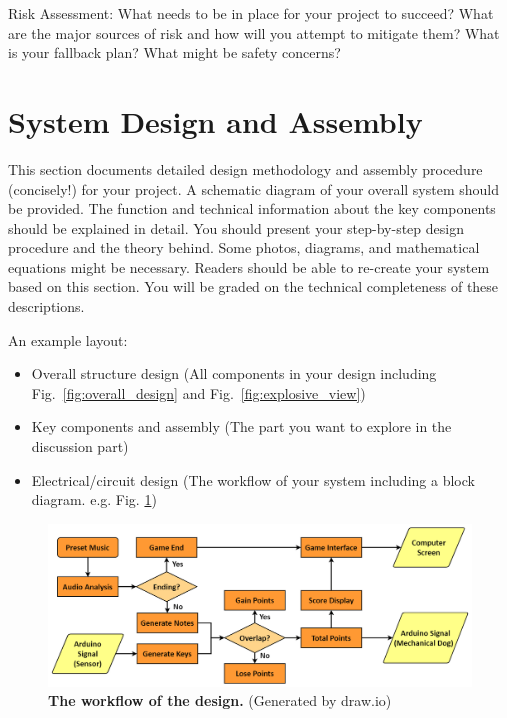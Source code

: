 \documentclass{engr1000j-s2}
\begin{document}
  Risk Assessment: What needs to be in place for your project to succeed? What are
  the major sources of risk and how will you attempt to mitigate them? What is
  your fallback plan? What might be safety concerns?

  \section{System Design and Assembly}
  This section documents detailed design methodology and assembly procedure (concisely!)
  for your project. A schematic diagram of your overall system should be provided.
  The function and technical information about the key components should be
  explained in detail. You should present your step-by-step design procedure and
  the theory behind. Some photos, diagrams, and mathematical equations might be
  necessary. Readers should be able to re-create your system based on this section.
  You will be graded on the technical completeness of these descriptions.

  An example layout:

  \begin{itemize}
    \item Overall structure design (All components in your design including Fig.~\ref{fig:overall_design} and Fig.~\ref{fig:explosive_view})\\

    \item Key components and assembly (The part you want to explore in the discussion part)\\

    \item Electrical/circuit design (The workflow of your system including a block diagram. e.g. Fig. \ref{fig:block_diagram})
  \end{itemize}

  \begin{figure}[H]
    \centering
    \includegraphics[width=\textwidth]{figures/block_diagram_sample.png}
    \caption{\quad \textbf{The workflow of the design.} (Generated by draw.io)}
    \label{fig:block_diagram}
  \end{figure}
\end{document}
